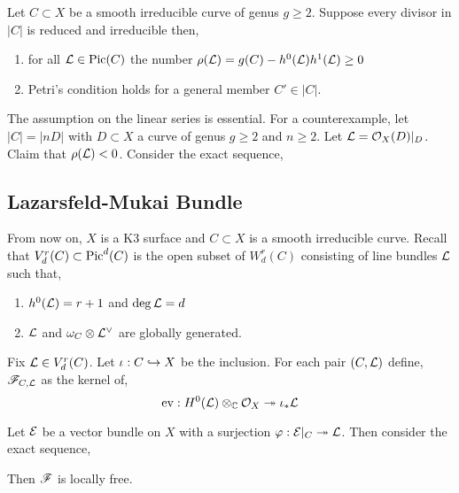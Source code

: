\documentclass[12pt]{article}
\begin{document}
\begin{theorem}
Let $C \subset X$ be a smooth irreducible curve of genus $g \ge 2$. Suppose every divisor in $|C|$ is reduced and irreducible then,
\begin{enumerate}
\item for all $\mathcal{L} \in \mathrm{Pic}{(C)}$ the number $\rho(\mathcal{L}) = g(C) - h^0(\mathcal{L}) h^1(\mathcal{L}) \ge 0$ 
\item Petri's condition holds for a general member $C' \in |C|$.
\end{enumerate}
\end{theorem}

\begin{rmk}
The assumption on the linear series is essential. For a counterexample, let $|C| = |n D|$ with $D \subset X$ a curve of genus $g \ge 2$ and $n \ge 2$. Let $\mathcal{L} = \mathcal{O}_{X}(D)|_D$. Claim that $\rho(\mathcal{L}) < 0$. Consider the exact sequence,
\begin{center}
\end{center}
\end{rmk}

\subsection{Lazarsfeld-Mukai Bundle}

From now on, $X$ is a K3 surface and $C \subset X$ is a smooth irreducible curve. Recall that $V^r_d(C) \subset \mathrm{Pic}^d(C)$ is the open subset of $W^r_d(C)$ consisting of line bundles $\mathcal{L}$ such that,
\begin{enumerate}
\item $h^0(\mathcal{L}) = r + 1$ and $\deg{\mathcal{L}} = d$
\item $\mathcal{L}$ and $\omega_C \otimes \mathcal{L}^\vee$ are globally generated. 
\end{enumerate}

\begin{defn}
Fix $\mathcal{L} \in V^r_d(C)$. Let $\iota : C \hookrightarrow X$ be the inclusion. For each pair $(C, \mathcal{L})$ define, $\mathscr{F}_{C,\mathcal{L}}$ as the kernel of,
\[ \mathrm{ev} : H^0(\mathcal{L}) \otimes_{\mathbb{C}} \mathcal{O}_{X} \twoheadrightarrow \iota_* \mathcal{L} \]
\end{defn}

\begin{lemma}
Let $\mathcal{E}$ be a vector bundle on $X$ with a surjection $\varphi : \mathcal{E} |_C \twoheadrightarrow \mathcal{L}$. Then consider the exact sequence,
\begin{center}
\end{center}
Then $\mathscr{F}$ is locally free.
\end{lemma}
\end{document}
